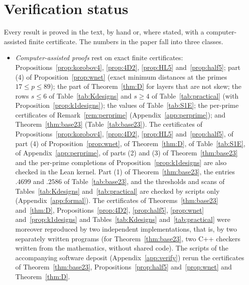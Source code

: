 \documentclass[11pt]{amsart}
\theoremstyle{definition}
\theoremstyle{plain}
\begin{document}
\section{Verification status}\label{sec:formal}
Every result is proved in the text, by hand or, where stated, with a computer-assisted finite certificate. The numbers in the paper fall into three classes.
\begin{itemize}
\item \emph{Computer-assisted proofs} rest on exact finite certificates: Propositions~\ref{prop:korobov4}, \ref{prop:4D2}, \ref{prop:HL5} and~\ref{prop:half5}; part (4) of Proposition~\ref{prop:wnet} (exact minimum distances at the primes $17\le p\le89$); the part of Theorem~\ref{thm:D} for layers that are not skew; the rows $s\le6$ of Table~\ref{tab:Kdesigns} and $s\ge4$ of Table~\ref{tab:practical} (with Proposition~\ref{prop:k1designs}); the values of Table~\ref{tab:S1E}; the per-prime certificates of Remark~\ref{rem:perprime} (Appendix~\ref{app:perprime}); and Theorem~\ref{thm:base23} (Table~\ref{tab:base23}). The certificates of Propositions~\ref{prop:korobov4}, \ref{prop:4D2}, \ref{prop:HL5} and~\ref{prop:half5}, of part (4) of Proposition~\ref{prop:wnet}, of Theorem~\ref{thm:D}, of Table~\ref{tab:S1E}, of Appendix~\ref{app:perprime}, of parts (2) and (3) of Theorem~\ref{thm:base23} and the per-prime completions of Proposition~\ref{prop:k1designs} are also checked in the Lean kernel. Part (1) of Theorem~\ref{thm:base23}, the entries $.4699$ and $.2586$ of Table~\ref{tab:base23}, and the thresholds and scans of Tables~\ref{tab:Kdesigns} and~\ref{tab:practical} are checked by scripts only (Appendix~\ref{app:formal}). The certificates of Theorems~\ref{thm:base23} and~\ref{thm:D}, Propositions~\ref{prop:4D2}, \ref{prop:half5}, \ref{prop:wnet} and~\ref{prop:k1designs} and Tables~\ref{tab:Kdesigns} and~\ref{tab:practical} were moreover reproduced by two independent implementations, that is, by two separately written programs (for Theorem~\ref{thm:base23}, two C++ checkers written from the mathematics, without shared code). The scripts of the accompanying software deposit (Appendix~\ref{app:verify}) rerun the certificates of Theorem~\ref{thm:base23}, Propositions~\ref{prop:half5} and~\ref{prop:wnet} and Theorem~\ref{thm:D}.

\end{itemize}
\end{document}
